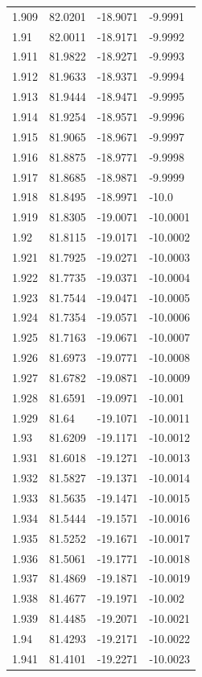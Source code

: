 \begin{tabular}{llll}
1.909 & 82.0201 & -18.9071 & -9.9991 \\
1.91 & 82.0011 & -18.9171 & -9.9992 \\
1.911 & 81.9822 & -18.9271 & -9.9993 \\
1.912 & 81.9633 & -18.9371 & -9.9994 \\
1.913 & 81.9444 & -18.9471 & -9.9995 \\
1.914 & 81.9254 & -18.9571 & -9.9996 \\
1.915 & 81.9065 & -18.9671 & -9.9997 \\
1.916 & 81.8875 & -18.9771 & -9.9998 \\
1.917 & 81.8685 & -18.9871 & -9.9999 \\
1.918 & 81.8495 & -18.9971 & -10.0 \\
1.919 & 81.8305 & -19.0071 & -10.0001 \\
1.92 & 81.8115 & -19.0171 & -10.0002 \\
1.921 & 81.7925 & -19.0271 & -10.0003 \\
1.922 & 81.7735 & -19.0371 & -10.0004 \\
1.923 & 81.7544 & -19.0471 & -10.0005 \\
1.924 & 81.7354 & -19.0571 & -10.0006 \\
1.925 & 81.7163 & -19.0671 & -10.0007 \\
1.926 & 81.6973 & -19.0771 & -10.0008 \\
1.927 & 81.6782 & -19.0871 & -10.0009 \\
1.928 & 81.6591 & -19.0971 & -10.001 \\
1.929 & 81.64 & -19.1071 & -10.0011 \\
1.93 & 81.6209 & -19.1171 & -10.0012 \\
1.931 & 81.6018 & -19.1271 & -10.0013 \\
1.932 & 81.5827 & -19.1371 & -10.0014 \\
1.933 & 81.5635 & -19.1471 & -10.0015 \\
1.934 & 81.5444 & -19.1571 & -10.0016 \\
1.935 & 81.5252 & -19.1671 & -10.0017 \\
1.936 & 81.5061 & -19.1771 & -10.0018 \\
1.937 & 81.4869 & -19.1871 & -10.0019 \\
1.938 & 81.4677 & -19.1971 & -10.002 \\
1.939 & 81.4485 & -19.2071 & -10.0021 \\
1.94 & 81.4293 & -19.2171 & -10.0022 \\
1.941 & 81.4101 & -19.2271 & -10.0023 \\

\end{tabular}
